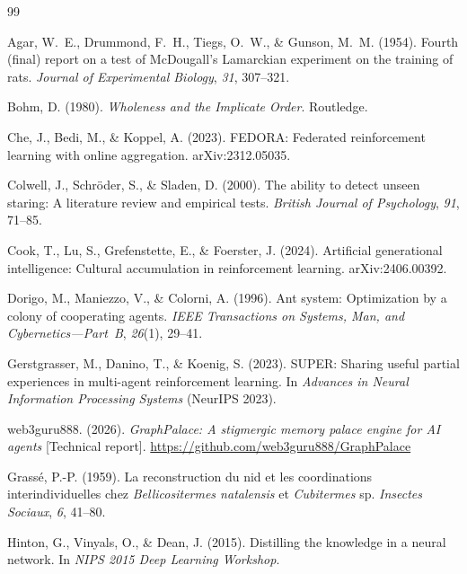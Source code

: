 \documentclass[twoside,11pt]{article}
\begin{document}
\begin{thebibliography}{99}

Agar, W.~E., Drummond, F.~H., Tiegs, O.~W., \& Gunson, M.~M. (1954).
Fourth (final) report on a test of McDougall's Lamarckian experiment on the
training of rats.
\textit{Journal of Experimental Biology}, \textit{31}, 307--321.

Bohm, D. (1980).
\textit{Wholeness and the Implicate Order}.
Routledge.

Che, J., Bedi, M., \& Koppel, A. (2023).
FEDORA: Federated reinforcement learning with online aggregation.
arXiv:2312.05035.

Colwell, J., Schr\"{o}der, S., \& Sladen, D. (2000).
The ability to detect unseen staring: A literature review and empirical tests.
\textit{British Journal of Psychology}, \textit{91}, 71--85.

Cook, T., Lu, S., Grefenstette, E., \& Foerster, J. (2024).
Artificial generational intelligence: Cultural accumulation in reinforcement
learning.
arXiv:2406.00392.

Dorigo, M., Maniezzo, V., \& Colorni, A. (1996).
Ant system: Optimization by a colony of cooperating agents.
\textit{IEEE Transactions on Systems, Man, and Cybernetics---Part~B},
\textit{26}(1), 29--41.

Gerstgrasser, M., Danino, T., \& Koenig, S. (2023).
SUPER: Sharing useful partial experiences in multi-agent reinforcement
learning.
In \textit{Advances in Neural Information Processing Systems} (NeurIPS 2023).

web3guru888. (2026).
\textit{GraphPalace: A stigmergic memory palace engine for AI agents}
[Technical report].
\url{https://github.com/web3guru888/GraphPalace}

Grass\'{e}, P.-P. (1959).
La reconstruction du nid et les coordinations interindividuelles chez
\textit{Bellicositermes natalensis} et \textit{Cubitermes} sp.
\textit{Insectes Sociaux}, \textit{6}, 41--80.

Hinton, G., Vinyals, O., \& Dean, J. (2015).
Distilling the knowledge in a neural network.
In \textit{NIPS 2015 Deep Learning Workshop}.


\end{thebibliography}
\end{document}
